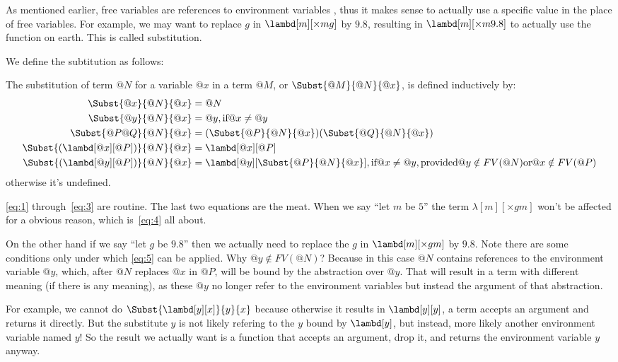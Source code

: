 \documentclass[../../../include/open-logic-section]{subfiles}
\begin{document}

As mentioned earlier, free variables are references to environment variables
, thus it makes sense to actually use a specific value in the place of free
variables. For example, we may want to replace $g$ in
$\lambd[m][\times m g]$ by $9.8$, resulting in $\lambd[m][\times m
9.8]$ to actually use the function on earth. This is
called substitution.

We define the subtitution as follows:

\begin{defn}[Substitution]
  The substitution of term $@N$ for a variable $@x$ in a term $@M$, or
  $\Subst{@M}{@N}{@x}$,  is defined inductively by:
  \begin{align}
    \Subst{@x}{@N}{@x}       &= @N \label{eq:1} \\
    \Subst{@y}{@N}{@x}       &= @y, \text{if} @x \neq @y \label{eq:2} \\
    \Subst{@P@Q}{@N}{@x} &= (\Subst{@P}{@N}{@x}) (\Subst{@Q}{@N}{@x}) \label{eq:3} \\
    \Subst{(\lambd[@x][@P])}{@N}{@x}  &= \lambd[@x][@P] \label{eq:4} \\
    \Subst{(\lambd[@y][@P])}{@N}{@x}  &= \lambd[@y][\Subst{@P}{@N}{@x}], \text{if} @x \neq @y,
    \text{provided} @y \notin FV(@N) \text{or} @x \notin FV(@P) \label{eq:5}
  \end{align}
  otherwise it's undefined.
\end{defn}

\eqref{eq:1} through~\eqref{eq:3} are routine. The last two equations are
the meat. When we say ``let $m$ be $5$'' the term
$\lambda[m][\times g m]$ won't be affected for a obvious reason, which
is~\eqref{eq:4} all about. 

On the other hand if we say ``let $g$ be $9.8$'' then we actually need
to replace the $g$ in $\lambd[m][\times g m]$ by $9.8$. Note there are
some conditions only under which
\eqref{eq:5} can be applied. Why $@y \notin FV(@N)$? Because in this
case $@N$ contains references to the environment variable $@y$, which,
after $@N$ replaces $@x$ in $@P$, will be bound by the abstraction over
$@y$. That will result in a term with different meaning (if there is any
meaning), as these $@y$ no longer refer to the environment variables but instead the argument
of that abstraction. 

For example, we cannot do $\Subst{\lambd[y][x]}{y}{x}$ because
otherwise it results in $\lambd[y][y]$, a term accepts an argument and
returns it directly. But the substitute $y$ is not likely refering
to the $y$ bound by $\lambd[y]$, but instead, more likely another
environment variable named $y$! So the result we actually want is a
function that accepts an argument, drop it, and returns the
environment variable $y$ anyway.
\end{document}
